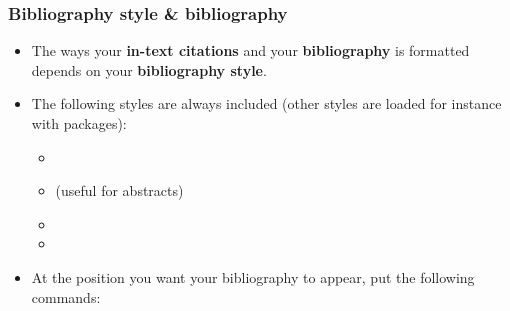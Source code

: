 \begin{frame}[fragile]
\frametitle{Bibliography style \& bibliography}

\begin{itemize}
	\item The ways your \textbf{in-text citations} and your \textbf{bibliography} is formatted depends on your \textbf{bibliography style}. 
	
	
	\item The following styles are always included (other styles are loaded for instance with packages):
	
	\begin{itemize}
		\item {}
		\item {} (useful for abstracts)
		\item {}
		\item {}
	\end{itemize}


\item At the position you want your bibliography to appear, put the following commands:



\end{itemize}

\begin{multicols}{2}

\begin{lstlisting}

 
\end{lstlisting}

\columnbreak

\begin{lstlisting}

 
\end{lstlisting}

\end{multicols}

\end{frame}


